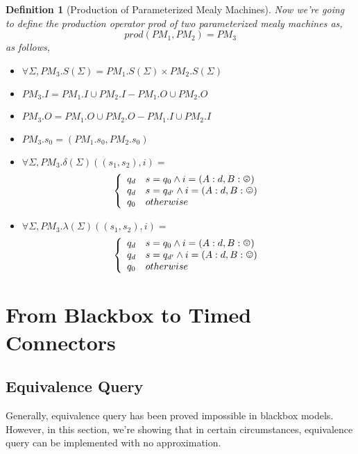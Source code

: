 \documentclass[conference, a4paper]{IEEEtran}
\newtheorem{definition}{Definition}
\newcommand{\rread}[0]{\smiley}
\newcommand{\rnoread}[0]{\frownie}
\begin{document}
\begin{definition}[Production of Parameterized Mealy Machines]
  Now we're going to define the production operator \emph{prod} of two parameterized mealy machines as,
  \[
  prod(PM_1,PM_2)=PM_3
  \]
  as follows, 
  \begin{itemize}
  	\item[-] $\forall\Sigma, PM_3.S(\Sigma)=PM_1.S(\Sigma)\times PM_2.S(\Sigma)$
    \item[-] $PM_3.I=PM_1.I\cup PM_2.I-PM_1.O\cup PM_2.O$
    \item[-] $PM_3.O=PM_1.O\cup PM_2.O-PM_1.I\cup PM_2.I$
    \item[-] $PM_3.s_0=(PM_1.s_0, PM_2.s_0)$
    \item[-] $\forall\Sigma, PM_3.\delta(\Sigma)((s_1,s_2), i)=$
      \begin{displaymath}
        \left\{
        \begin{array}[h]{ll}
          q_d & s=q_0\land i=(A:d,B:\rnoread) \\
          q_d & s=q_{d'}\land i=(A:d,B:\rread) \\
          q_0 & otherwise \\
        \end{array}
        \right.
      \end{displaymath}
    \item[-] $\forall\Sigma, PM_3.\lambda(\Sigma)((s_1,s_2),i)=$
      \begin{displaymath}
        \left\{
        \begin{array}[h]{ll}
          q_d & s=q_0\land i=(A:d,B:\rnoread) \\
          q_d & s=q_{d'}\land i=(A:d,B:\rread) \\
          q_0 & otherwise \\
        \end{array}
        \right.
      \end{displaymath}
  \end{itemize}
\end{definition}

\section{From Blackbox to Timed Connectors}
\subsection{Equivalence Query}
Generally, equivalence query has been proved impossible in blackbox
models\cite{DBLP:journals/iandc/Angluin87}. However, in this
section, we're showing that in certain circumstances, equivalence query can be implemented with
no approximation.
\end{document}
